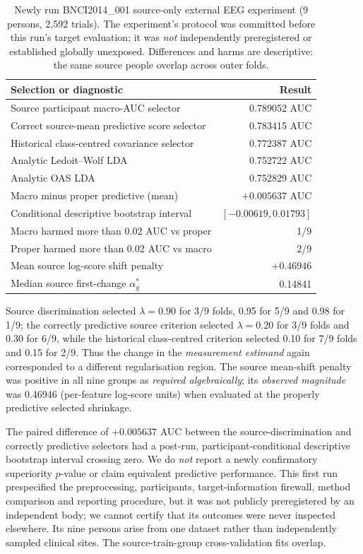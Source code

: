 \begin{table}[tb]
\centering
\small
\caption{Newly run BNCI2014\_001 source-only
external EEG experiment (9 persons, 2,592 trials).
The experiment's protocol was committed before this
run's target evaluation; it was \emph{not}
independently preregistered or established
globally unexposed. Differences and harms are
descriptive: the same source people overlap
across outer folds.}
\label{tab:v20-new-cohort}
\begin{tabular}{lr}
\toprule
Selection or diagnostic & Result\\
\midrule
Source participant macro-AUC selector & 0.789052 AUC\\
Correct source-mean predictive score selector & 0.783415 AUC\\
Historical class-centred covariance selector & 0.772387 AUC\\
Analytic Ledoit--Wolf LDA & 0.752722 AUC\\
Analytic OAS LDA & 0.752829 AUC\\
Macro minus proper predictive (mean) & $+0.005637$ AUC\\
Conditional descriptive bootstrap interval & $[-0.00619,0.01793]$\\
Macro harmed more than 0.02 AUC vs proper & 1/9\\
Proper harmed more than 0.02 AUC vs macro & 2/9\\
Mean source log-score shift penalty & $+0.46946$\\
Median source first-change $\alpha_g^*$ & 0.14841\\
\bottomrule
\end{tabular}
\end{table}

Source discrimination selected
$\lambda=0.90$ for 3/9 folds,
0.95 for 5/9 and 0.98 for 1/9;
the correctly predictive source criterion
selected $\lambda=0.20$ for 3/9 folds
and 0.30 for 6/9, while the historical
class-centred criterion selected 0.10
for 7/9 folds and 0.15 for 2/9.
Thus the change in the \emph{measurement
estimand} again corresponded to a
different regularisation region.
The source mean-shift penalty was
positive in all nine groups as
\emph{required algebraically}; its
\emph{observed magnitude} was
0.46946 (per-feature log-score units)
when evaluated at the properly
predictive selected shrinkage.

The paired difference of
$+0.005637$ AUC between the
source-discrimination and correctly
predictive selectors had a post-run,
participant-conditional descriptive
bootstrap interval crossing zero.
We do \emph{not} report a newly
confirmatory superiority $p$-value or
claim equivalent predictive
performance. This first run
prespecified the preprocessing,
participants, target-information firewall,
method comparison and reporting
procedure, but it was not publicly
preregistered by an independent body;
we cannot certify that its outcomes
were never inspected elsewhere.
Its nine persons arise from one dataset
rather than independently sampled
clinical sites. The source-train-group
cross-validation fits overlap.

